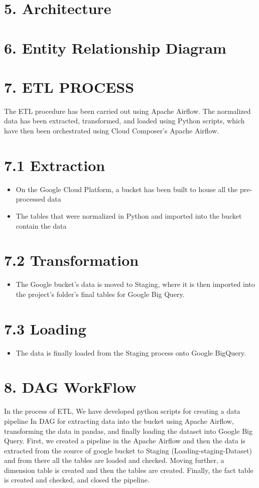 \documentclass[10pt,twocolumn,letterpaper]{article}
\begin{document}
\section{5. Architecture}
\section{6. Entity Relationship Diagram}
\section{7. ETL PROCESS}
The ETL procedure has been carried out using Apache Airflow. The normalized data has been extracted, transformed, and loaded using Python scripts, which have then been orchestrated using Cloud Composer's Apache Airflow.
\section{7.1 Extraction}
\begin{itemize}
	\item   On the Google Cloud Platform, a bucket has been built to house all the pre-processed data
	\item  The tables that were normalized in Python and imported into the bucket contain the data
 \end{itemize}
 \section{7.2 Transformation}
\begin{itemize}
	\item  The Google bucket's data is moved to Staging, where it is then imported into the project's folder's final tables for Google Big Query.
 \end{itemize}
  \section{7.3 Loading}
\begin{itemize}
	\item  The data is finally loaded from the Staging process onto Google BigQuery.
 \end{itemize}
 \section{8. DAG WorkFlow}
In the process of ETL, We have developed python scripts for creating a data pipeline In DAG  for extracting data into the bucket using Apache Airflow, transforming the data in pandas, and finally loading the dataset into Google Big Query.
First, we created a pipeline in the Apache Airflow and then the data is extracted from the source of google bucket to Staging (Loading-staging-Dataset) and from there all the tables are loaded and checked. Moving further, a dimension table is created and then the tables are created. Finally, the fact table is created and checked, and closed the pipeline.
\end{document}
